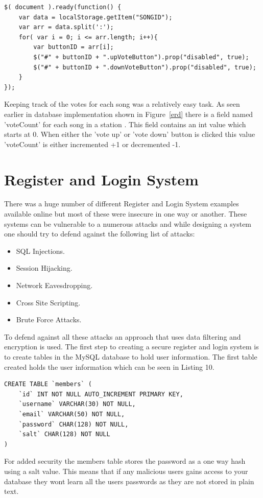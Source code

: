 \documentclass[a4paper, 12pt]{report}
\begin{document}
\begin{lstlisting}[caption=Disabling buttons for previously voted songs]
$( document ).ready(function() {
	var data = localStorage.getItem("SONGID");
	var arr = data.split(':');
	for( var i = 0; i <= arr.length; i++){
		var buttonID = arr[i];
		$("#" + buttonID + ".upVoteButton").prop("disabled", true);
		$("#" + buttonID + ".downVoteButton").prop("disabled", true);
	}		
});
\end{lstlisting}

Keeping track of the votes for each song was a relatively easy task. As seen earlier in database implementation shown in Figure~\ref{erd} there is a field named 'voteCount' for each song in a station . This field contains an int value which starts at 0. When either the 'vote up' or 'vote down' button is clicked this value 'voteCount' is either incremented +1 or decremented -1.

\section{Register and Login System}
There was a huge number of different Register and Login System examples available online but most of these were insecure in one way or another. These systems can be vulnerable to a numerous attacks and while designing a system one should try to defend against the following list of attacks:
\begin{itemize}
\item SQL Injections.
\item Session Hijacking.
\item Network Eavesdropping.
\item Cross Site Scripting. 
\item Brute Force Attacks.
\end{itemize} 
To defend against all these attacks an approach that uses data filtering and encryption is used. The first step to creating a secure register and login system is to create tables in the MySQL database to hold user information. The first table created holds the user information which can be seen in Listing 10. 
\begin{lstlisting}[caption=Code used to create the members table]
CREATE TABLE `members` (
    `id` INT NOT NULL AUTO_INCREMENT PRIMARY KEY,
    `username` VARCHAR(30) NOT NULL,
    `email` VARCHAR(50) NOT NULL,
    `password` CHAR(128) NOT NULL,
    `salt` CHAR(128) NOT NULL 
)
\end{lstlisting}
For added security the members table stores the password as a one way hash using a salt value. This means that if any malicious users gains access to your database they wont learn all the users passwords as they are not stored in plain text.
\end{document}
